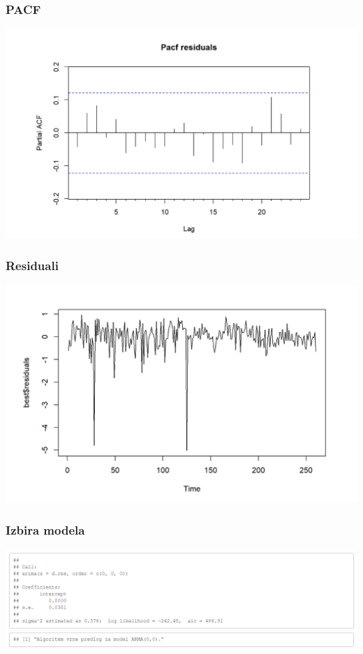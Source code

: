 \documentclass[10pt]{beamer}
\begin{document}
\begin{frame}
\frametitle{PACF}
\includegraphics[width=1\textwidth]{PacfB.png}
\end{frame}


\begin{frame}
\frametitle{Residuali}
\includegraphics[width=1\textwidth]{best_res_B.png}
\end{frame}



\begin{frame}
\frametitle{Izbira modela}
\includegraphics[width=1\textwidth]{ModelB.png}
\end{frame}
\end{document}
